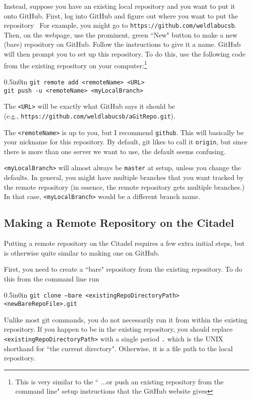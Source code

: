 \documentclass[11pt]{article}
\newcommand{\code}[1]{\begin{adjustwidth}{0.5in}{0in}
    \texttt{#1}
    \end{adjustwidth}}
\begin{document}
Instead, suppose you have an existing local repository and you want to put it onto GitHub.  First, log into GitHub and figure out where you want to put the repository \textemdash\ For example, you might go to \texttt{https://github.com/weldlabucsb}.  Then, on the webpage, use the prominent, green ``New" button to make a new (bare) repository on GitHub.  Follow the instructions to give it a name.  GitHub will then prompt you to set up this repository.  To do this, use the following code from the existing repository on your computer:\footnote{This is very similar to the `` ...or push an existing repository from the command line" setup instructions that the GitHub website gives}

\code{git remote add <remoteName> <URL>\\
git push -u <remoteName> <myLocalBranch>}

The \texttt{<URL>} will be exactly what GitHub says it should be\\ (e.g., \texttt{https://github.com/weldlabucsb/aGitRepo.git}).  

The \texttt{<remoteName>} is up to you, but I recommend \texttt{github}.  This will basically be your nickname for this repository.  By default, git likes to call it \texttt{origin}, but since there is more than one server we want to use, the default seems confusing.

\texttt{<myLocalBranch>} will almost always be \texttt{master} at setup, unless you change the defaults. In general, you might have multiple branches that you want tracked by the remote repository (in essence, the remote repository gets multiple branches.)  In that case, \texttt{<myLocalBranch>} would be a different branch name.

\subsection{Making a Remote Repository on the Citadel}

Putting a remote repository on the Citadel requires a few extra initial steps, but is otherwise quite similar to making one on GitHub.  

First, you need to create a ``bare" repository from the existing repository.  To do this from the command line run

\code{git clone --bare <existingRepoDirectoryPath> <newBareRepoFile>.git}

Unlike most git commands, you do not necessarily run it from within the existing repository.  If you happen to be in the existing repository, you should replace \texttt{<existingRepoDirectoryPath>} with a single period \texttt{.} which is the UNIX shorthand for ``the current directory".  Otherwise, it is a file path to the local repository.
\end{document}

